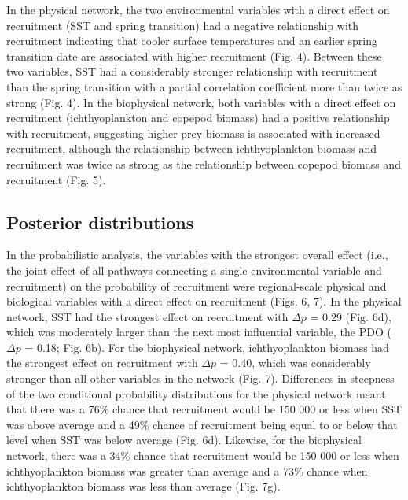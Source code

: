 In the physical network, the two environmental variables with a direct effect on
recruitment (SST and spring transition) had a negative relationship with
recruitment indicating that cooler surface temperatures and an earlier spring
transition date are associated with higher recruitment (Fig. 4). Between these
two variables, SST had a considerably stronger relationship with recruitment
than the spring transition with a partial correlation coefficient more than
twice as strong (Fig. 4). In the biophysical network, both variables with a
direct effect on recruitment (ichthyoplankton and copepod biomass) had a
positive relationship with recruitment, suggesting higher prey biomass is
associated with increased recruitment, although the relationship between
ichthyoplankton biomass and recruitment was twice as strong as the relationship
between copepod biomass and recruitment (Fig. 5).


\subsection{Posterior distributions}

In the probabilistic analysis, the variables with the strongest overall effect
(i.e., the joint effect of all pathways connecting a single environmental
variable and recruitment) on the probability of recruitment were regional-scale
physical and biological variables with a direct effect on recruitment (Figs. 6,
7). In the physical network, SST had the strongest effect on recruitment with
\(\Delta p\) = 0.29 (Fig.  6d), which was moderately larger than the next most
influential variable, the PDO (\(\Delta p\) = 0.18; Fig. 6b). For the
biophysical network, ichthyoplankton biomass had the strongest effect on
recruitment with \(\Delta p\) = 0.40, which was considerably stronger than all
other variables in the network (Fig. 7). Differences in steepness of the two
conditional probability distributions for the physical network meant that there
was a 76\% chance that recruitment would be 150 000 or less when SST was above
average and a 49\% chance of recruitment being equal to or below that level when
SST was below average (Fig. 6d). Likewise, for the biophysical network, there
was a 34\% chance that recruitment would be 150 000 or less when ichthyoplankton
biomass was greater than average and a 73\% chance when ichthyoplankton biomass
was less than average (Fig. 7g).

